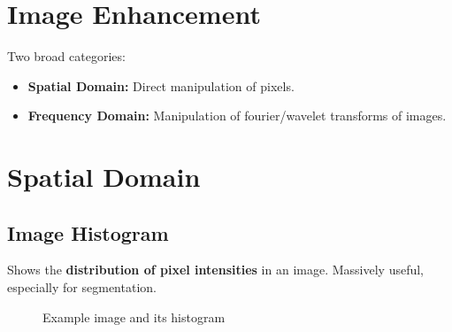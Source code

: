 \section*{Image Enhancement}

Two broad categories:

\begin{itemize}
  \item \textbf{Spatial Domain:} Direct manipulation of pixels.
  \item \textbf{Frequency Domain:} Manipulation of fourier/wavelet
    transforms of images.
\end{itemize}

\section*{Spatial Domain}

\subsection*{Image Histogram}

Shows the \textbf{distribution of pixel intensities} in an image.
Massively useful, especially for segmentation.

\begin{figure}[H]
  \centering
  \caption{Example image and its histogram}
\end{figure}

